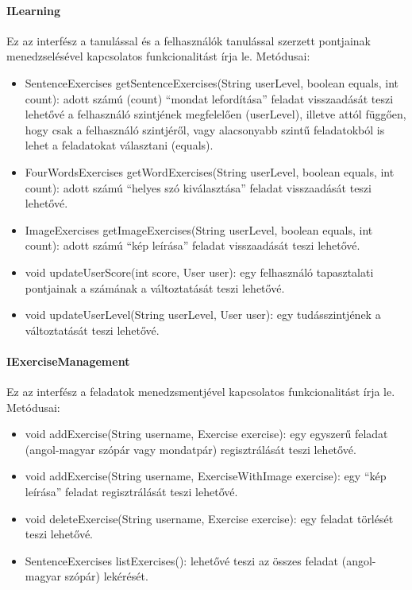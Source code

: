 \documentclass[11pt, a4paper]{article}
\begin{document}
    \paragraph{ILearning} Ez az interfész a tanulással és a felhasználók tanulással szerzett pontjainak menedzselésével kapcsolatos funkcionalitást írja le. Metódusai:
    \begin{itemize}
    	\item SentenceExercises getSentenceExercises(String userLevel, boolean equals, int count): adott számú (count) ``mondat lefordítása'' feladat visszaadását teszi lehetővé a felhasználó szintjének megfelelően (userLevel), illetve attól függően, hogy csak a felhasználó szintjéről, vagy alacsonyabb szintű feladatokból is lehet a feladatokat választani (equals).
    	
    	\item FourWordsExercises getWordExercises(String userLevel, boolean equals, int count): adott számú ``helyes szó kiválasztása'' feladat visszaadását teszi lehetővé.
    	
    	\item ImageExercises getImageExercises(String userLevel, boolean equals, int count): adott számú ``kép leírása'' feladat visszaadását teszi lehetővé.
    	
    	\item void updateUserScore(int score, User user): egy felhasználó tapasztalati pontjainak a számának a változtatását teszi lehetővé.
    	
    	\item void updateUserLevel(String userLevel, User user): egy tudásszintjének a változtatását teszi lehetővé.
    \end{itemize}
    \paragraph{IExerciseManagement} Ez az interfész a feladatok menedzsmentjével kapcsolatos funkcionalitást írja le. Metódusai:
    \begin{itemize}
    	\item void addExercise(String username, Exercise exercise): egy egyszerű feladat (angol-magyar szópár vagy mondatpár) regisztrálását teszi lehetővé.
    	
    	\item void addExercise(String username, ExerciseWithImage exercise): egy  ``kép leírása'' feladat regisztrálását teszi lehetővé.
    	
    	\item void deleteExercise(String username, Exercise exercise): egy feladat törlését teszi lehetővé.
    	
    	\item SentenceExercises listExercises(): lehetővé teszi az összes feladat (angol-magyar szópár) lekérését.
    \end{itemize}
    
\end{document}
